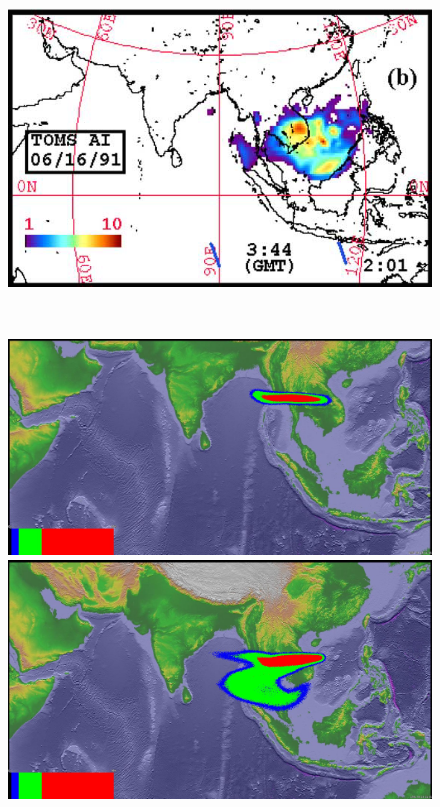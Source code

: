 \begin{figure}[!htb]
\begin{minipage}{.325 \textwidth}
        \includegraphics[width=0.99 \textwidth]{Chapter-7/Figures/OB-ash-23hr-ash}
    \end{minipage}%
    \\
        \begin{minipage}{.325\textwidth}
        \centering
        \includegraphics[width=0.99 \textwidth]{Chapter-7/Figures/bent-31hr-ash}
    \end{minipage}%
    \begin{minipage}{.325 \textwidth}
        \centering
        \includegraphics[width=0.99 \textwidth]{Chapter-7/Figures/SPH-Plume-31hr-ash}

\end{minipage}
\end{figure}

